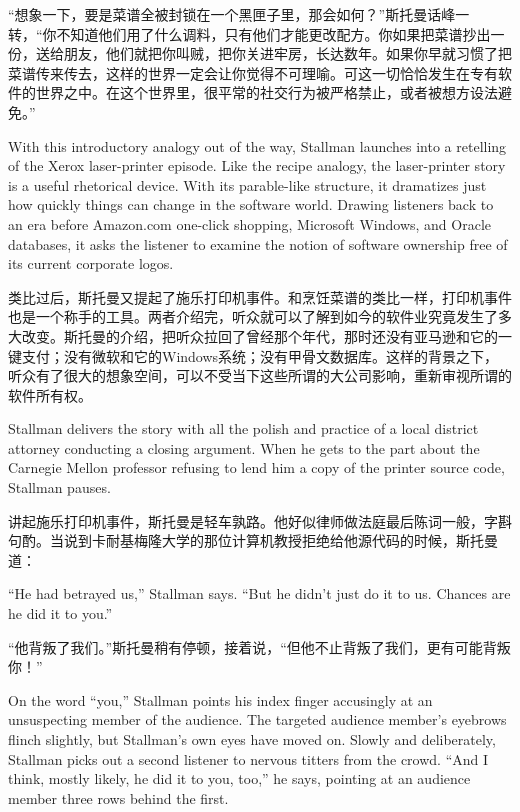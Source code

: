 \ifdefined\chs
``想象一下，要是菜谱全被封锁在一个黑匣子里，那会如何？''斯托曼话峰一转，``你不知道他们用了什么调料，只有他们才能更改配方。你如果把菜谱抄出一份，送给朋友，他们就把你叫贼，把你关进牢房，长达数年。如果你早就习惯了把菜谱传来传去，这样的世界一定会让你觉得不可理喻。可这一切恰恰发生在专有软件的世界之中。在这个世界里，很平常的社交行为被严格禁止，或者被想方设法避免。''
\fi

\ifdefined\eng
With this introductory analogy out of the way, Stallman launches into a retelling of the Xerox laser-printer episode. Like the recipe analogy, the laser-printer story is a useful rhetorical device. With its parable-like structure, it dramatizes just how quickly things can change in the software world. Drawing listeners back to an era before Amazon.com one-click shopping, Microsoft Windows, and Oracle databases, it asks the listener to examine the notion of software ownership free of its current corporate logos.
\fi

\ifdefined\chs
类比过后，斯托曼又提起了施乐打印机事件。和烹饪菜谱的类比一样，打印机事件也是一个称手的工具。两者介绍完，听众就可以了解到如今的软件业究竟发生了多大改变。斯托曼的介绍，把听众拉回了曾经那个年代，那时还没有亚马逊和它的一键支付；没有微软和它的Windows系统；没有甲骨文数据库。这样的背景之下，听众有了很大的想象空间，可以不受当下这些所谓的大公司影响，重新审视所谓的软件所有权。
\fi

\ifdefined\eng
Stallman delivers the story with all the polish and practice of a local district attorney conducting a closing argument. When he gets to the part about the Carnegie Mellon professor refusing to lend him a copy of the printer source code, Stallman pauses.
\fi

\ifdefined\chs
讲起施乐打印机事件，斯托曼是轻车孰路。他好似律师做法庭最后陈词一般，字斟句酌。当说到卡耐基梅隆大学的那位计算机教授拒绝给他源代码的时候，斯托曼道：
\fi

\ifdefined\eng
``He had betrayed us,'' Stallman says. ``But he didn't just do it to us. Chances are he did it to you.''
\fi

\ifdefined\chs
``他背叛了我们。''斯托曼稍有停顿，接着说，``但他不止背叛了我们，更有可能背叛你！''
\fi

\ifdefined\eng
On the word ``you,'' Stallman points his index finger accusingly at an unsuspecting member of the audience. The targeted audience member's eyebrows flinch slightly, but Stallman's own eyes have moved on. Slowly and deliberately, Stallman picks out a second listener to nervous titters from the crowd. ``And I think, mostly likely, he did it to you, too,'' he says, pointing at an audience member three rows behind the first.
\fi

